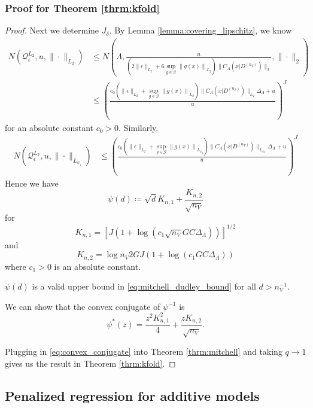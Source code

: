 \documentclass[10pt]{book}
\theoremstyle{definition}
\begin{document}
\subsubsection{Proof for Theorem \ref{thrm:kfold}}
\begin{proof}
	Next we determine $J_\delta$.
	By Lemma \ref{lemma:covering_lipschitz}, we know
	\begin{align}
	N(\mathcal{Q}_\epsilon^{L_2}, u, \|\cdot \|_{L_2})
	& \le N \left (
	\Lambda, 
	\frac{u}{
	\left (2 \|\epsilon\|_{L_2} + 6 \sup_{g \in \mathcal G} \left \|g(x) \right \|_{L_2} \right) \|C_\Lambda(x|D^{(n_T)})\|_2},
	\|\cdot \|_{2} \right)\\
	& \le
	\left (
	\frac{
		c_0 \left (\|\epsilon\|_{L_2} + \sup_{g \in \mathcal G} \left \|g(x) \right \|_{L_2} \right) \|C_\Lambda(x|D^{(n_T)})\|_{L_2} \Delta_{\Lambda} + u
	}{u}
	\right )^J
	\end{align}
	for an absolute constant $c_0 > 0$.
	Similarly,
	\begin{align}
	N(\mathcal{Q}_\epsilon^{L_2}, u, \|\cdot \|_{L_{\psi_1}})
	& \le
	\left (
	\frac{
		c_0 \left (\|\epsilon\|_{L_2} + \sup_{g \in \mathcal G} \left \|g(x) \right \|_{L_{\psi_2}} \right) \|C_\Lambda(x|D^{(n_T)})\|_{L_{\psi_2}} \Delta_{\Lambda} + u
	}{u}
	\right )^J
	\end{align}
	Hence we have
	\begin{equation}
	\psi(d) \coloneqq
	\sqrt{d}K_{n,1}
	+
	\frac{K_{n,2}}{\sqrt{n_V}} 
	\end{equation}
	for $$K_{n,1} = \left[J\left(1+\log\left(c_1\sqrt{n_V} GC \Delta_{\Lambda} \right)\right)\right]^{1/2}$$ 
	and 
	$$K_{n,2} = \log n_V 2GJ\left(1+\log\left(c_1 GC \Delta_{\Lambda} \right)\right)$$
	where $c_1 > 0$ is an absolute constant.
	
	$\psi(d)$ is a valid upper bound in \eqref{eq:mitchell_dudley_bound}  for all $d > n_V^{-1}$.
	
	We can show that the convex conjugate of $\psi^{-1}$ is
	\begin{equation}
	\label{eq:convex_conjugate}
	\psi^*(z) = \frac{z^2 K_{n,1}^2}{4} + \frac{z K_{n,2}}{\sqrt{n_V}}.
	\end{equation}	
	
	Plugging in \eqref{eq:convex_conjugate} into Theorem \ref{thrm:mitchell} and taking $q \rightarrow 1$ gives us the result in Theorem \ref{thrm:kfold}.
\end{proof}

\subsection{Penalized regression for additive models}
\end{document}
